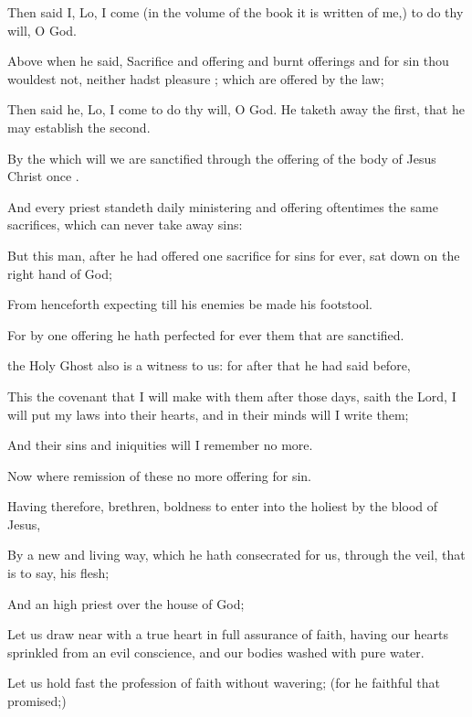 {Then said
I,
Lo, I
come (in the
volume of the
book it is
written
of
me,) to
do
thy
will, O
God.

Above
when he
said,
Sacrifice
and
offering
and burnt
offerings
and
{}
for
sin thou
wouldest
not,
neither hadst
pleasure
{};
which are
offered
by the
law;

Then said
he,
Lo, I
come to
do
thy
will, O
God. He taketh
away the
first,
that he may
establish the
second.

By
the
which
will we
are
sanctified
through the
offering of the
body of
Jesus
Christ
once
{}.

And
every
priest
standeth
daily
ministering
and
offering
oftentimes
the
same
sacrifices,
which
can
never take
away
sins:

But this
man, after he had
offered
one
sacrifice
for
sins
for
ever, sat
down
on the right
hand of
God;

From
henceforth
expecting
till
his
enemies be
made
his
footstool.

For by
one
offering he hath
perfected
for
ever them that are
sanctified.

the
Holy
Ghost
also is a
witness to
us:
for
after that he had said
before,

This
{} the
covenant
that I will
make
with
them
after
those
days,
saith the
Lord, I will
put
my
laws
into
their
hearts,
and
in
their
minds will I
write
them;

And
their
sins
and
iniquities will I
remember
no
more.

Now
where
remission of
these
{} no
more
offering
for
sin.


\par }{\PP {}Having
therefore,
brethren,
boldness
to enter
into the
holiest
by the
blood of
Jesus,

By
a
new
and
living
way,
which he hath
consecrated for
us,
through the
veil,
that is to
say,
his
flesh;

And
{}
an
high
priest
over the
house of
God;

Let us draw
near
with
a
true
heart
in full
assurance of
faith,
having our
hearts
sprinkled
from
an
evil
conscience,
and our
bodies
washed
with
pure
water.

Let us hold
fast the
profession
of
{}
faith without
wavering; (for
he
{}
faithful that
promised;)

}
